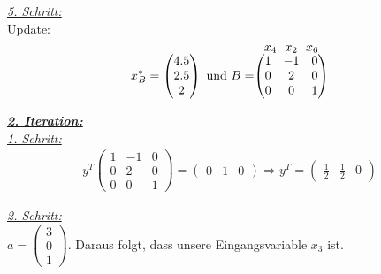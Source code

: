 \documentclass [a4paper,11pt]{article}
\begin{document}
\begin{enumerate}
\begin{enumerate}
            \underline{\textit{5. Schritt:}}\\
            Update:
            \begin{align*}
                x^*_B =
                \begin{pmatrix}
                    4.5\\
                    2.5\\
                    2
                \end{pmatrix}\ \text{und}\ B =
                \stackrel{\mbox{$ x_4\ \ x_2\ \ x_6 $}}{
                    \begin{pmatrix}
                        1 & -1 & 0\\
                        0 & 2 & 0\\
                        0 & 0 & 1
                    \end{pmatrix}
                }
            \end{align*}

            \underline{\textbf{\textit{2. Iteration:}}}\\
            \underline{\textit{1. Schritt:}}\\
            \begin{align*}
                y^T
                \begin{pmatrix}
                    1 & -1 & 0\\
                    0 & 2 & 0\\
                    0 & 0 & 1
                \end{pmatrix} = 
                \begin{pmatrix}
                    0 & 1 & 0
                \end{pmatrix}
                \Rightarrow y^T =
                \begin{pmatrix}
                    \frac{1}{2} & \frac{1}{2} & 0
                \end{pmatrix}
            \end{align*}

            \underline{\textit{2. Schritt:}}\\
            $a = \begin{pmatrix} 3\\ 0\\ 1 \end{pmatrix}$. Daraus folgt, dass unsere Eingangsvariable $x_3$ ist.\\


\end{enumerate}
\end{enumerate}
\end{document}
